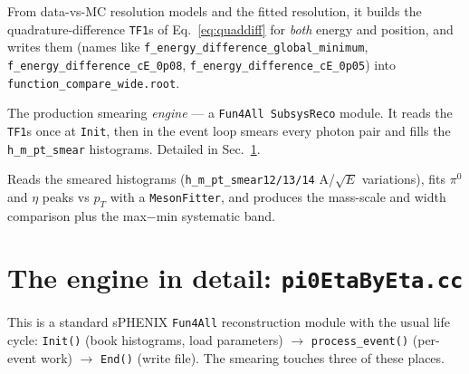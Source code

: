 \documentclass[11pt]{article}
\begin{document}
\begin{description}[leftmargin=1.2em,style=nextline]
\item[Stage 1 --- \texttt{mass\_plot.C}] From data-vs-MC resolution models and the
  fitted resolution, it builds the quadrature-difference \texttt{TF1}s of
  Eq.~\eqref{eq:quaddiff} for \emph{both} energy and position, and writes them
  (names like \texttt{f\_energy\_difference\_global\_minimum},
  \texttt{f\_energy\_difference\_cE\_0p08}, \texttt{f\_energy\_difference\_cE\_0p05})
  into \texttt{function\_compare\_wide.root}.
\item[Stage 2 --- \texttt{pi0EtaByEta.cc}] The production smearing \emph{engine}
  --- a \texttt{Fun4All SubsysReco} module. It reads the \texttt{TF1}s once at
  \texttt{Init}, then in the event loop smears every photon pair and fills the
  \texttt{h\_m\_pt\_smear} histograms. Detailed in Sec.~\ref{sec:engine}.
\item[Stage 3 --- \texttt{smear\_compare.C}] Reads the smeared histograms
  (\texttt{h\_m\_pt\_smear12/13/14} A/$\sqrt{E}$ variations), fits $\pi^0$ and
  $\eta$ peaks vs $p_T$ with a \texttt{MesonFitter}, and produces the mass-scale
  and width comparison plus the max$-$min systematic band.
\end{description}

\section{The engine in detail: \texttt{pi0EtaByEta.cc}}
\label{sec:engine}
This is a standard sPHENIX \texttt{Fun4All} reconstruction module with the usual
life cycle: \texttt{Init()} (book histograms, load parameters) $\to$
\texttt{process\_event()} (per-event work) $\to$ \texttt{End()} (write file).
The smearing touches three of these places.
\end{document}

